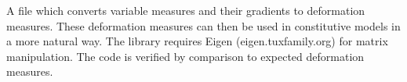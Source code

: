 A file which converts variable measures and their gradients to deformation measures. These deformation measures can then be used in constitutive models in a more natural way. The library requires Eigen (eigen.tuxfamily.org) for matrix manipulation. The code is verified by comparison to expected deformation measures.
